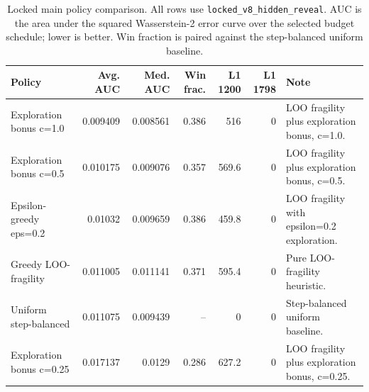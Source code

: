 \begin{table}[htbp]
\centering
\small
\caption{Locked main policy comparison. All rows use \texttt{locked\_v8\_hidden\_reveal}. AUC is the area under the squared Wasserstein-2 error curve over the selected budget schedule; lower is better. Win fraction is paired against the step-balanced uniform baseline.}
\label{tab:main-policy-comparison}
\begin{tabularx}{\textwidth}{lrrrrrX}
\toprule
Policy & Avg. AUC & Med. AUC & Win frac. & L1 1200 & L1 1798 & Note \\
\midrule
Exploration bonus c=1.0 & 0.009409 & 0.008561 & 0.386 & 516 & 0 & LOO fragility plus exploration bonus, c=1.0. \\
Exploration bonus c=0.5 & 0.010175 & 0.009076 & 0.357 & 569.6 & 0 & LOO fragility plus exploration bonus, c=0.5. \\
Epsilon-greedy eps=0.2 & 0.01032 & 0.009659 & 0.386 & 459.8 & 0 & LOO fragility with epsilon=0.2 exploration. \\
Greedy LOO-fragility & 0.011005 & 0.011141 & 0.371 & 595.4 & 0 & Pure LOO-fragility heuristic. \\
Uniform step-balanced & 0.011075 & 0.009439 & -- & 0 & 0 & Step-balanced uniform baseline. \\
Exploration bonus c=0.25 & 0.017137 & 0.0129 & 0.286 & 627.2 & 0 & LOO fragility plus exploration bonus, c=0.25. \\
\bottomrule
\end{tabularx}
\end{table}
